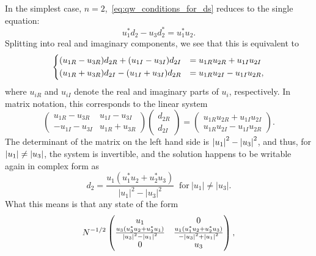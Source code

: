 In the simplest case, $n=2$,~\cref{eq:qw_conditions_for_ds} reduces to the single equation:
\begin{equation}
    u_1^* d_2 - u_3 d_2^* = u_1^* u_2.
\end{equation}
Splitting into real and imaginary components, we see that this is equivalent to
\begin{equation}
    \begin{dcases}
        (u_{1R} - u_{3R})d_{2R} + (u_{1I} - u_{3I})d_{2I} &=
        u_{1R}u_{2R} + u_{1I} u_{2I} \\
        (u_{1R} + u_{3R}) d_{2I} - (u_{1I} + u_{3I}) d_{2R} &=
        u_{1R} u_{2I} - u_{1I} u_{2R},
    \end{dcases}
\end{equation}
where $u_{iR}$ and $u_{iI}$ denote the real and imaginary parts of $u_i$, respectively.
In matrix notation, this corresponds to the linear system
\begin{equation}
    \begin{pmatrix}
        u_{1R} - u_{3R} & u_{1I} - u_{3I} \\
        -u_{1I} - u_{3I} & u_{1R} + u_{3R}
    \end{pmatrix}
    \begin{pmatrix}
        d_{2R} \\ d_{2I}
    \end{pmatrix} =
    \begin{pmatrix}
        u_{1R}u_{2R} + u_{1I} u_{2I} \\
        u_{1R} u_{2I} - u_{1I} u_{2R}
    \end{pmatrix}.
\end{equation}
The determinant of the matrix on the left hand side is $\abs{u_1}^2-\abs{u_3}^2$, and thus, for $\abs{u_1}\neq\abs{u_3}$, the system is invertible, and the solution happens to be writable again in complex form as
\begin{equation}
	d_2 = \frac{
		u_1(u_1^* u_2 + u_2^* u_3)
	}{
		\lvert u_1 \rvert^2 - \lvert u_3 \rvert^2
	}~\text{ for}~\lvert u_1 \rvert \neq \lvert u_3 \rvert.
	\label{eq:qw_solution_for_d2}
\end{equation}
What this means is that any state of the form
\begin{equation}
    N^{-1/2} \begin{pmatrix}
        u_1 & 0 \\
        \frac{u_3(u_3^* u_2 + u_2^* u_1)}{\abs{u_3}^2 - \abs{u_1}^2} &
        \frac{u_1(u_1^* u_2 + u_2^* u_3)}{-\abs{u_3}^2 + \abs{u_1}^2} \\
        0 & u_3
    \end{pmatrix},
    \label{eq:qw_solution_for_d2_fullstate_matrixform}
\end{equation}
